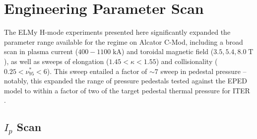 \section{Engineering Parameter Scan}\label{sec:elmy_engineer}

The ELMy H-mode experiments presented here significantly expanded the parameter range available for the regime on Alcator C-Mod, including a broad scan in plasma current ($400-1100\;\si{\kilo\ampere}$) and toroidal magnetic field ($3.5, 5.4, 8.0\;\si{\tesla}$), as well as sweeps of elongation ($1.45 < \kappa < 1.55$) and collisionality ($0.25 < \nu_{95}^* < 6$).  This sweep entailed a factor of $\sim 7$ sweep in pedestal pressure -- notably, this expanded the range of pressure pedestals tested against the EPED model to within a factor of two of the target pedestal thermal pressure for ITER \cite{Snyder2011}.

\subsection{$I_p$ Scan}\label{subsec:elmy_ip}

